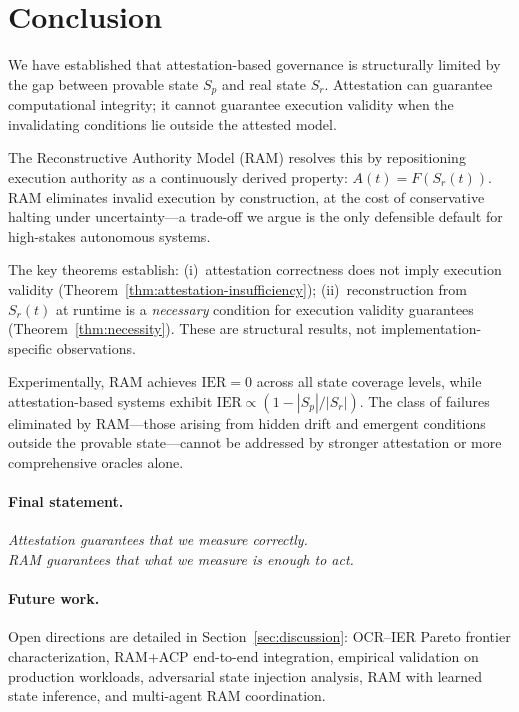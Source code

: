 \documentclass[11pt]{article}
\newcommand{\Sr}{S_r}
\newcommand{\Sp}{S_p}
\newcommand{\IER}{\mathrm{IER}}
\begin{document}
\section{Conclusion}
\label{sec:conclusion}

We have established that attestation-based governance is structurally limited
by the gap between provable state $\Sp$ and real state $\Sr$.
Attestation can guarantee computational integrity; it cannot guarantee
execution validity when the invalidating conditions lie outside the attested
model.

The Reconstructive Authority Model (RAM) resolves this by repositioning
execution authority as a continuously derived property:
$A(t) = F(\Sr(t))$.
RAM eliminates invalid execution by construction, at the cost of conservative
halting under uncertainty---a trade-off we argue is the only defensible default
for high-stakes autonomous systems.

The key theorems establish:
(i)~attestation correctness does not imply execution validity
(Theorem~\ref{thm:attestation-insufficiency});
(ii)~reconstruction from $\Sr(t)$ at runtime is a \emph{necessary} condition
for execution validity guarantees (Theorem~\ref{thm:necessity}).
These are structural results, not implementation-specific observations.

Experimentally, RAM achieves $\IER = 0$ across all state coverage levels,
while attestation-based systems exhibit $\IER \propto (1 - |\Sp|/|\Sr|)$.
The class of failures eliminated by RAM---those arising from hidden drift
and emergent conditions outside the provable state---cannot be addressed by
stronger attestation or more comprehensive oracles alone.

\paragraph{Final statement.}
\begin{center}
\textit{Attestation guarantees that we measure correctly.}\\[0.2em]
\textit{RAM guarantees that what we measure is enough to act.}
\end{center}

\paragraph{Future work.}
Open directions are detailed in Section~\ref{sec:discussion}:
OCR--IER Pareto frontier characterization, RAM+ACP end-to-end integration,
empirical validation on production workloads, adversarial state injection
analysis, RAM with learned state inference, and multi-agent RAM coordination.
\end{document}
